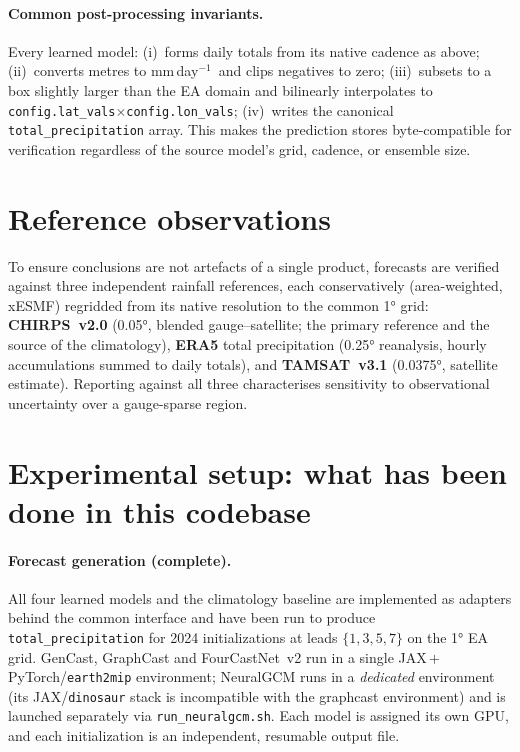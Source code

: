 \documentclass[11pt]{article}
\newcommand{\code}[1]{\texttt{\small #1}}
\newcommand{\mmday}{mm\,day$^{-1}$}
\begin{document}
\paragraph{Common post-processing invariants.} Every learned model:
(i)~forms daily totals from its native cadence as above;
(ii)~converts metres to \mmday\ and clips negatives to zero;
(iii)~subsets to a box slightly larger than the EA domain and bilinearly
interpolates to \code{config.lat\_vals}${\times}$\code{config.lon\_vals};
(iv)~writes the canonical \code{total\_precipitation} array. This makes the
prediction stores byte-compatible for verification regardless of the source
model's grid, cadence, or ensemble size.

\section{Reference observations}

To ensure conclusions are not artefacts of a single product, forecasts are
verified against three independent rainfall references, each conservatively
(area-weighted, xESMF) regridded from its native resolution to the common
\ang{1} grid: \textbf{CHIRPS~v2.0} (\ang{0.05}, blended gauge--satellite; the
primary reference and the source of the climatology), \textbf{ERA5} total
precipitation (\ang{0.25} reanalysis, hourly accumulations summed to daily
totals), and \textbf{TAMSAT~v3.1} (\ang{0.0375}, satellite estimate). Reporting
against all three characterises sensitivity to observational uncertainty over a
gauge-sparse region.

\section{Experimental setup: what has been done in this codebase}
\label{sec:metrics}

\paragraph{Forecast generation (complete).} All four learned models and the
climatology baseline are implemented as adapters behind the common interface and
have been run to produce \code{total\_precipitation} for 2024 initializations at
leads $\{1,3,5,7\}$ on the \ang{1} EA grid. GenCast, GraphCast and
FourCastNet~v2 run in a single JAX\,$+$\,PyTorch/\code{earth2mip} environment;
NeuralGCM runs in a \emph{dedicated} environment (its JAX/\code{dinosaur} stack
is incompatible with the graphcast environment) and is launched separately via
\code{run\_neuralgcm.sh}. Each model is assigned its own GPU, and each
initialization is an independent, resumable output file.
\end{document}
